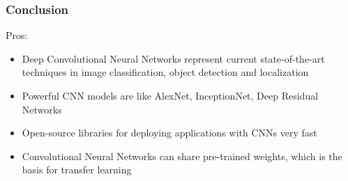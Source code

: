 %
%
%
%
%
%
%
%
%
%

\begin{frame}[fragile] \frametitle{Conclusion}
Pros:
\begin{itemize}
\item  Deep Convolutional Neural Networks represent current state-of-the-art techniques in image 
classification, object detection and localization
\item  Powerful CNN models are like AlexNet, InceptionNet, Deep Residual Networks
\item  Open-source libraries for deploying applications with CNNs very fast
\item  Convolutional Neural Networks can share pre-trained weights, which is the basis for transfer learning 
\end{itemize}
\end{frame}

